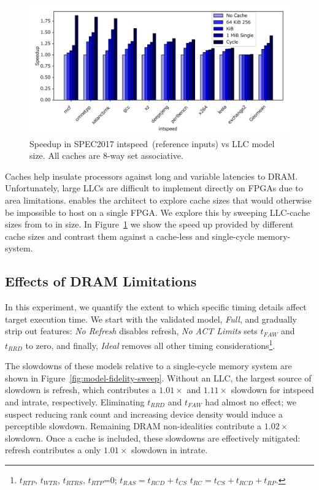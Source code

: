 \begin{figure}[t]
    \centering
    \includegraphics[width=\columnwidth]{figures/cache_size_bar_plot.pdf}
    \vspace{-0.35in}
    \caption{Speedup in SPEC2017 intspeed~(reference inputs) vs LLC model size. All caches are 8-way set associative.}
    \label{fig:llc-speedup}
    \vspace{-0.15in}
\end{figure}

Caches help insulate processors against long and variable latencies to DRAM.
Unfortunately, large LLCs are difficult to implement directly on FPGAs due to
area limitations. \PNAME enables the architect to explore cache sizes that
would otherwise be impossible to host on a single FPGA. We explore this by
sweeping LLC-cache sizes from  to  in size. In
Figure~\ref{fig:llc-speedup} we show the speed up provided by different cache
sizes and contrast them against a cache-less and single-cycle memory-system.

\subsection{Effects of DRAM Limitations}

In this experiment, we quantify the extent to which specific timing details
affect target execution time. We start with the validated model, \emph{Full}, and
gradually strip out features: \emph{No Refresh} disables refresh, \emph{No ACT
Limits} sets $t_{FAW}$ and $t_{RRD}$ to zero, and finally, \emph{Ideal} removes
all other timing considerations\footnote{$t_{RTP}$, $t_{WTR}$,
$t_{RTRS}$, $t_{RTP}$=0; $t_{RAS} = t_{RCD} + t_{CS}$ $t_{RC} =
t_{CS} + t_{RCD} + t_{RP}$.}.

The slowdowns of these models relative to a single-cycle memory system are
shown in Figure~\ref{fig:model-fidelity-sweep}. Without an LLC, the largest
source of slowdown is refresh, which contributes a $1.01\times$ and
$1.11\times$ slowdown for intspeed and intrate, respectively.  Eliminating $t_{RRD}$ and $t_{FAW}$ had almost no effect; we
suspect reducing rank count and increasing device density would induce a perceptible slowdown.
Remaining DRAM non-idealities contribute a $1.02\times$ slowdown.  Once
a cache is included, these slowdowns are effectively mitigated: refresh
contributes a only $1.01\times$ slowdown in intrate.

